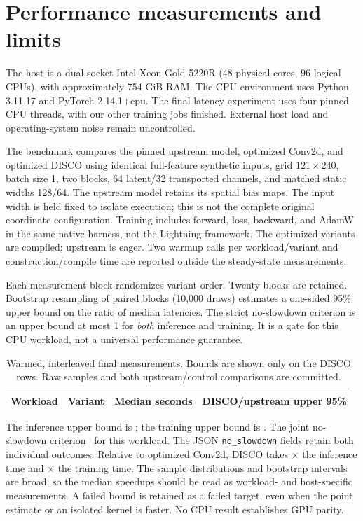 \documentclass[10pt]{article}
\begin{document}
\section{Performance measurements and limits}
The host is a dual-socket Intel Xeon Gold 5220R (48 physical cores, 96 logical CPUs),
with approximately 754 GiB RAM. The CPU environment uses Python 3.11.17 and
PyTorch 2.14.1+cpu. The final latency experiment uses four pinned CPU threads,
with our other training jobs finished. External host load and operating-system
noise remain uncontrolled.

The benchmark compares the pinned upstream model, optimized Conv2d, and optimized
DISCO using identical full-feature synthetic inputs, grid $121\times240$, batch
size 1, two blocks, 64 latent/32 transported channels, and matched static widths
128/64. The upstream model retains its spatial bias maps. The input width is
held fixed to isolate execution; this is not the complete original coordinate
configuration. Training includes forward, loss, backward, and AdamW in the same
native harness, not the Lightning framework. The optimized variants are compiled;
upstream is eager. Two warmup calls per workload/variant and construction/compile
time are reported outside the steady-state measurements.

Each measurement block randomizes variant order. Twenty blocks are retained.
Bootstrap resampling of paired blocks (10,000 draws) estimates a one-sided 95\%
upper bound on the ratio of median latencies. The strict no-slowdown criterion is
an upper bound at most 1 for \emph{both} inference and training. It is a gate for
this CPU workload, not a universal performance guarantee.

\begin{table}[ht]
\centering
\begin{tabular}{llrr}
\toprule
Workload & Variant & Median seconds & DISCO/upstream upper 95\% \\
\midrule

\bottomrule
\end{tabular}
\caption{Warmed, interleaved final measurements. Bounds are shown only on the
DISCO rows. Raw samples and both upstream/control comparisons are committed.}
\end{table}
The inference upper bound is \InferenceBound; the training upper bound is
\TrainingBound. The joint no-slowdown criterion \SpeedGate\ for this workload.
The JSON \texttt{no\_slowdown} fields retain both individual outcomes.
Relative to optimized Conv2d, DISCO takes \InferenceControlRatio$\times$ the
inference time and \TrainingControlRatio$\times$ the training time.
The sample distributions and bootstrap intervals are broad, so the median
speedups should be read as workload- and host-specific measurements.
A failed bound is retained as a failed target, even when the point estimate or an
isolated kernel is faster. No CPU result establishes GPU parity.
\end{document}
